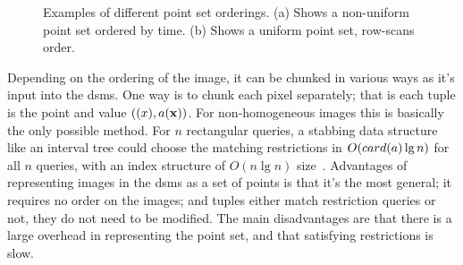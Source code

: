 \documentclass{sig-alternate}
\begin{document}
\begin{figure}[htbp]
  \centering
\subfigure{
 \begin{FramePic}[10,10]
 \end{FramePic}
}  
\label{fig:lidar}
\caption{%
%
  Examples of different point set orderings.  (a) Shows a non-uniform
  point set ordered by time.  (b) Shows a uniform point set, row-scans
  order.  }
\end{figure}

Depending on the ordering of the image, it can be chunked in various
ways as it's input into the \ac{dsms}.  One way is to chunk each pixel
separately; that is each tuple is the point and value
$({\bf{(}}x),a({\bf{x}}))$.  For non-homogeneous images this is basically
the only possible method.  For $n$ rectangular queries, a stabbing
data structure like an interval tree could choose the matching
restrictions in $O({card(a)}\lg{n})$ for all $n$ queries, with an index
structure of $O(n\lg{n})$ size~\cite{spatialalgos}.  Advantages of
representing images in the \ac{dsms} as a set of points is that it's
the most general; it requires no order on the images; and tuples
either match restriction queries or not, they do not need to be
modified.  The main disadvantages are that there is a large overhead
in representing the point set, and that satisfying restrictions is
slow.
\end{document}
